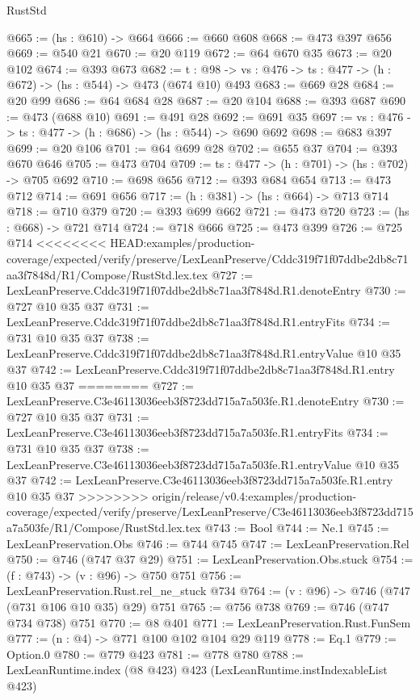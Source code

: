 \begin{lexlean}{RustStd}
\begin{coremodule}
{\begin{coremodule}
@665 := (hs : @610) -> @664
@666 := @660 @608
@668 := @473 @397 @656
@669 := @540 @21
@670 := @20 @119
@672 := @64 @670 @35
@673 := @20 @102
@674 := @393 @673
@682 := {t : @98} -> {vs : @476} -> {ts : @477} -> (h : @672) -> (hs : @544) -> @473 (@674 @10) @493
@683 := @669 @28
@684 := @20 @99
@686 := @64 @684 @28
@687 := @20 @104
@688 := @393 @687
@690 := @473 (@688 @10)
@691 := @491 @28
@692 := @691 @35
@697 := {vs : @476} -> {ts : @477} -> (h : @686) -> (hs : @544) -> @690 @692
@698 := @683 @397
@699 := @20 @106
@701 := @64 @699 @28
@702 := @655 @37
@704 := @393 @670 @646
@705 := @473 @704
@709 := {ts : @477} -> (h : @701) -> (hs : @702) -> @705 @692
@710 := @698 @656
@712 := @393 @684 @654
@713 := @473 @712
@714 := @691 @656
@717 := (h : @381) -> (hs : @664) -> @713 @714
@718 := @710 @379
@720 := @393 @699 @662
@721 := @473 @720
@723 := (hs : @668) -> @721 @714
@724 := @718 @666
@725 := @473 @399
@726 := @725 @714
<<<<<<<< HEAD:examples/production-coverage/expected/verify/preserve/LexLeanPreserve/Cddc319f71f07ddbe2db8c71aa3f7848d/R1/Compose/RustStd.lex.tex
@727 := LexLeanPreserve.Cddc319f71f07ddbe2db8c71aa3f7848d.R1.denoteEntry
@730 := @727 @10 @35 @37
@731 := LexLeanPreserve.Cddc319f71f07ddbe2db8c71aa3f7848d.R1.entryFits
@734 := @731 @10 @35 @37
@738 := LexLeanPreserve.Cddc319f71f07ddbe2db8c71aa3f7848d.R1.entryValue @10 @35 @37
@742 := LexLeanPreserve.Cddc319f71f07ddbe2db8c71aa3f7848d.R1.entry @10 @35 @37
========
@727 := LexLeanPreserve.C3e46113036eeb3f8723dd715a7a503fe.R1.denoteEntry
@730 := @727 @10 @35 @37
@731 := LexLeanPreserve.C3e46113036eeb3f8723dd715a7a503fe.R1.entryFits
@734 := @731 @10 @35 @37
@738 := LexLeanPreserve.C3e46113036eeb3f8723dd715a7a503fe.R1.entryValue @10 @35 @37
@742 := LexLeanPreserve.C3e46113036eeb3f8723dd715a7a503fe.R1.entry @10 @35 @37
>>>>>>>> origin/release/v0.4:examples/production-coverage/expected/verify/preserve/LexLeanPreserve/C3e46113036eeb3f8723dd715a7a503fe/R1/Compose/RustStd.lex.tex
@743 := Bool
@744 := Ne.{1}
@745 := LexLeanPreservation.Obs
@746 := @744 @745
@747 := LexLeanPreservation.Rel
@750 := @746 (@747 @37 @29)
@751 := LexLeanPreservation.Obs.stuck
@754 := (f : @743) -> (v : @96) -> @750 @751
@756 := LexLeanPreservation.Rust.rel_ne_stuck @734
@764 := (v : @96) -> @746 (@747 (@731 @106 @10 @35) @29) @751
@765 := @756 @738
@769 := @746 (@747 @734 @738) @751
@770 := @8 @401
@771 := LexLeanPreservation.Rust.FunSem
@777 := (n : @4) -> @771 @100 @102 @104 @29 @119
@778 := Eq.{1}
@779 := Option.{0}
@780 := @779 @423
@781 := @778 @780
@788 := LexLeanRuntime.index (@8 @423) @423 (LexLeanRuntime.instIndexableList @423)

\end{coremodule}}
\end{coremodule}
\end{lexlean}
